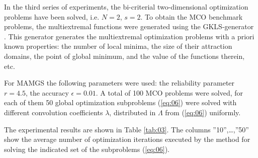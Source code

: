\documentclass[smallcondensed]{svjour3}     %
\begin{document}
In the third series of experiments, the bi-criterial two-dimensional optimization problems have been solved, i.e. $N=2$, $s=2$. To obtain the MCO benchmark problems, the multiextremal functions were generated using the GKLS-generator \cite{c14}. This generator generates the multiextremal optimization problems with a priori known properties: the number of local minima, the size of their attraction domains, the point of global minimum, and the value of the functions therein, etc.\par

For MAMGS the following parameters were used: the reliability parameter $r=4.5$, the accuracy $\epsilon = 0.01$. A total of 100 MCO problems were solved, for each of them 50 global optimization subproblems (\ref{eq:06}) were solved with different convolution coefficients $\lambda$, distributed in $\Lambda$ from (\ref{eq:06}) uniformly. \par
 
The experimental results are shown in Table \ref{tab:03}. The columns ''10'',\dots,''50'' show the average number of optimization iterations executed by the method for solving the indicated set of the subproblems (\ref{eq:06}).
\end{document}

